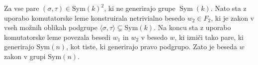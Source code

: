 Za vse pare $(\sigma, \tau) \in \text{Sym}(k)^2$, ki ne generirajo grupe $\operatorname{Sym}(k)$. Nato sta z uporabo komutatorske leme konstruirala netrivialno besedo $w_2 \in F_2$, ki je zakon v vseh možnih oblikah podgrupe $\langle \sigma, \tau \rangle \subsetneq \text{Sym}(k)$.
Na koncu sta z uporabo komutatorske leme povezala besedi $w_1$ in $w_2$ v besedo $w$, ki izniči tako pare, ki generirajo $\text{Sym}(n)$, kot tiste, ki generirajo pravo podgrupo. Zato je beseda $w$ zakon v grupi $\text{Sym}(n)$.  

